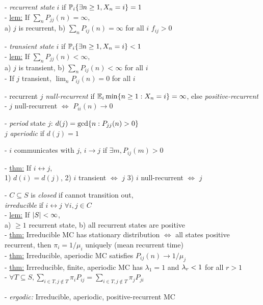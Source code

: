 \documentclass[10pt]{article}
\DeclarePairedDelimiter{\set}{\lbrace}{\rbrace}
\DeclarePairedDelimiter{\card}{\lvert}{\rvert}
\let\abs\relax
\DeclarePairedDelimiter{\abs}{\lvert}{\rvert}
\newcommand{\E}{\mathbb{E}}
\renewcommand{\P}{\mathbb{P}}
\newcommand{\sset}{\subseteq}
\begin{document}
\begin{multicols}{3}
- \emph{recurrent state} $i$ if $\P_i\set{\exists n\geq 1, X_n=i} = 1$ \\
- \underline{lem:} If $\sum_n P_{jj}(n) = \infty$, \\
a) $j$ is recurrent,
b) $\sum_n P_{ij}(n) = \infty$ for all $i$ $f_{ij} > 0$

- \emph{transient state} $i$ if $\P_i\set{\exists n\geq 1, X_n=i} < 1$ \\
- \underline{lem:} If $\sum_n P_{jj}(n) < \infty$, \\
a) $j$ is transient,
b) $\sum_n P_{ij}(n) < \infty$ for all $i$ \\
- If $j$ transient,
$\lim_n P_{ij}(n) = 0$ for all $i$

- recurrent $j$ \emph{null-recurrent} if $\E_i \min\set{n\geq 1: X_n=i} = \infty$,
else \emph{positive-recurrent} \\
- $j$ null-recurrent $\iff$ $P_{ii}(n)\to 0$

- \emph{period} state $j$:
$d(j) = \gcd\set{n: P_{jj}(n) > 0}$ \\
$j$ \emph{aperiodic} if $d(j) = 1$

- $i$ communicates with $j$,
$i\to j$ if $\exists m, P_{ij}(m) > 0$

- \underline{thm:} If $i\leftrightarrow j$, \\
1) $d(i) = d(j)$,
2) $i$ transient $\iff$ $j$
3) $i$ null-recurrent $\iff$ $j$

- $C\sset S$ is \emph{closed} if cannot transition out, \\
\emph{irreducible} if $i\leftrightarrow j$ $\forall i, j\in C$ \\
- \underline{lem:} If $\card S < \infty$, \\
a) $\geq 1$ recurrent state,
b) all recurrent states are positive \\
- \underline{thm:} Irreducible MC has stationary distribution
$\iff$ all states positive recurrent,
then $\pi_i = 1/\mu_i$ uniquely (mean recurrent time) \\
- \underline{thm:} Irreducible, aperiodic MC satisfies $P_{ij}(n)\to 1/\mu_j$ \\
- \underline{thm:} Irrreducible, finite, aperiodic MC
has $\lambda_1 = 1$ and $\abs{\lambda_r} < 1$ for all $r > 1$ \\
- $\forall T\sset S,
\sum_{i\in T, j\notin T} \pi_i P_{ij}
= \sum_{i\in T, j\notin T} \pi_j P_{ji}$

- \emph{ergodic:} Irreducible, aperiodic, positive-recurrent MC


\end{multicols}
\end{document}
